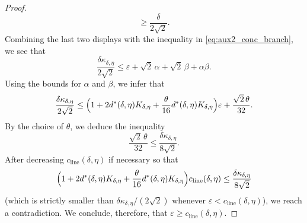 \documentclass[10pt,a4paper]{amsart}
\newcommand{\eps}{\varepsilon}
\begin{document}
\begin{proof}
\[	\ge \frac{\delta}{2\sqrt2}.
	\]
	Combining the last two displays with the inequality in \eqref{eq:aux2_conc_branch}, we see that
	\[
	\frac{\delta\kappa_{\delta,\eta}}{2\sqrt2}
	\le
	\eps+\sqrt2\,\alpha+\sqrt2\,\beta+\alpha\beta.
	\]
	Using the bounds for $\alpha$ and $\beta$, we infer that
	\[
	\frac{\delta\kappa_{\delta,\eta}}{2\sqrt2}
	\le
	\Bigl(1+2d^*(\delta,\eta)K_{\delta,\eta}
	+\frac{\theta}{16}d^*(\delta,\eta)K_{\delta,\eta}\Bigr)\eps
	+\frac{\sqrt2\,\theta}{32}.
	\]
	By the choice of $\theta$, we deduce the inequality
	\[
	\frac{\sqrt2\,\theta}{32}
	\le \frac{\delta\kappa_{\delta,\eta}}{8\sqrt2}.
	\]
	After decreasing $c_{\mathrm{line}}(\delta,\eta)$ if necessary so that
	\[
	\Bigl(1+2d^*(\delta,\eta)K_{\delta,\eta}
	+\frac{\theta}{16}d^*(\delta,\eta)K_{\delta,\eta}\Bigr)
	c_{\mathrm{line}}(\delta,\eta)
	\le \frac{\delta\kappa_{\delta,\eta}}{8\sqrt2}
	\]
	(which is strictly smaller than
$\delta\kappa_{\delta,\eta}/(2\sqrt2)$ whenever
	$\eps<c_{\mathrm{line}}(\delta,\eta)$), we reach a contradiction. We conclude, therefore, that
	$\eps\ge c_{\mathrm{line}}(\delta,\eta)$.
\vspace{0.5em}


\end{proof}
\end{document}
